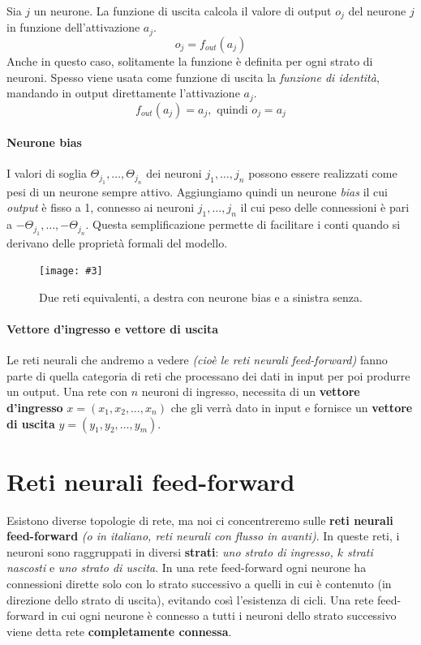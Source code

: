 \documentclass[12pt, twoside, letterpaper]{report}
\newcommand{\img}[4] {
	\begin{figure}
		\centering
		\texttt{[image: \#3]}\\
		\caption{#1}
		\label{#4}
	\end{figure}
}
\begin{document}
			 	Sia $j$ un neurone. La funzione di uscita calcola il valore di output $o_j$ del neurone $j$ in funzione dell'attivazione $a_j$. $$o_j = f_{out}(a_j)$$  
			 	Anche in questo caso, solitamente la funzione è definita per ogni strato di neuroni. Spesso viene usata come funzione di uscita la \textit{funzione di identità}, mandando in output direttamente l'attivazione $a_j$. $$f_{out}(a_j) = a_j, \text{ quindi } o_j = a_j$$
			 	
			 \paragraph{Neurone bias} I valori di soglia $\Theta_{j_1}, \dots, \Theta_{j_n}$ dei neuroni $j_1, \dots, j_n$ possono essere realizzati come pesi di un neurone sempre attivo. Aggiungiamo quindi un neurone \textit{bias} il cui \textit{output} è fisso a 1, connesso ai neuroni $j_1, \dots, j_n$ il cui peso delle connessioni è pari a $-\Theta_{j_1}, \dots, -\Theta_{j_n}$. Questa semplificazione permette di facilitare i conti quando si derivano delle proprietà formali del modello.
			 
			 	\img{Due reti equivalenti, a destra con neurone bias e a sinistra senza. \cite{kriesel}}{0.5}{bias-neuron.png}{bias}
			 	
			 \paragraph{Vettore d'ingresso e vettore di uscita} Le reti neurali che andremo a vedere \textit{(cioè le reti neurali feed-forward)} fanno parte di quella categoria di reti che processano dei dati in input per poi produrre un output. Una rete con $n$ neuroni di ingresso, necessita di un \textbf{vettore d'ingresso} $x = (x_1, x_2, \dots, x_n)$ che gli verrà dato in input e fornisce un \textbf{vettore di uscita} $y = (y_1, y_2, \dots, y_m)$.  
			 	 			 
		\section{Reti neurali feed-forward}
			Esistono diverse topologie di rete, ma noi ci concentreremo sulle \textbf{reti neurali feed-forward} \textit{(o in italiano, reti neurali con flusso in avanti)}. In queste reti, i neuroni sono raggruppati in diversi \textbf{strati}: \textit{uno strato di ingresso, $k$ strati nascosti} e \textit{uno strato di uscita}. In una rete feed-forward ogni neurone ha connessioni dirette solo con lo strato successivo a quelli in cui è contenuto (in direzione dello strato di uscita), evitando così l'esistenza di cicli. Una rete feed-forward in cui ogni neurone è connesso a tutti i neuroni dello strato successivo viene detta rete \textbf{completamente connessa}.
\end{document}
